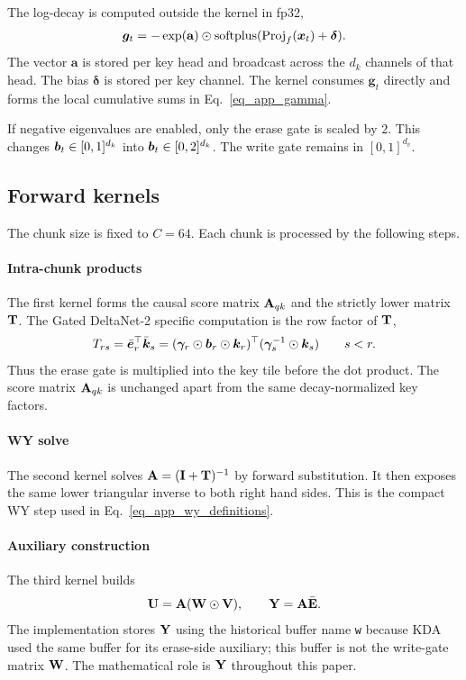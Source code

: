 The log-decay is computed outside the kernel in fp32,
\begin{align}
    \boldsymbol{g}_t
    =
    -\exp(\mathbf{a})\odot
    \operatorname{softplus}(\operatorname{Proj}_{f}({\bm{x}}_t)+\boldsymbol{\delta}).
\label{eq_app_layer_decay}
\end{align}
The vector $\mathbf{a}$ is stored per key head and broadcast across the $d_k$ channels of that head. The bias $\boldsymbol{\delta}$ is stored per key channel. The kernel consumes $\boldsymbol{g}_t$ directly and forms the local cumulative sums in Eq.~\ref{eq_app_gamma}.

If negative eigenvalues are enabled, only the erase gate is scaled by $2$. This changes ${\bm{b}}_t\in[0,1]^{d_k}$ into ${\bm{b}}_t\in[0,2]^{d_k}$. The write gate remains in $[0,1]^{d_v}$.

\subsection{Forward kernels}
\label{app_forward_kernels}

The chunk size is fixed to $C=64$. Each chunk is processed by the following steps.

\paragraph{Intra-chunk products}
The first kernel forms the causal score matrix ${\mathbf{A}}_{qk}$ and the strictly lower matrix ${\mathbf{T}}$. The Gated DeltaNet-2 specific computation is the row factor of ${\mathbf{T}}$,
\begin{align}
    T_{rs}
    =
    \bar{{\bm{e}}}_r^\top\bar{{\bm{k}}}_s
    =
    (\boldsymbol{\gamma}_r\odot{\bm{b}}_r\odot{\bm{k}}_r)^\top
    (\boldsymbol{\gamma}_s^{-1}\odot{\bm{k}}_s)
    \qquad
    s<r .
\label{eq_app_kernel_T}
\end{align}
Thus the erase gate is multiplied into the key tile before the dot product. The score matrix ${\mathbf{A}}_{qk}$ is unchanged apart from the same decay-normalized key factors.

\paragraph{WY solve}
The second kernel solves ${\mathbf{A}}=({\mathbf{I}}+{\mathbf{T}})^{-1}$ by forward substitution. It then exposes the same lower triangular inverse to both right hand sides. This is the compact WY step used in Eq.~\ref{eq_app_wy_definitions}.

\paragraph{Auxiliary construction}
The third kernel builds
\begin{align}
    {\mathbf{U}} = {\mathbf{A}}({\mathbf{W}}\odot{\mathbf{V}}),
    \qquad
    {\mathbf{Y}} = {\mathbf{A}}\bar{{\mathbf{E}}}.
\label{eq_app_kernel_aux}
\end{align}
The implementation stores ${\mathbf{Y}}$ using the historical buffer name \texttt{w} because KDA used the same buffer for its erase-side auxiliary; this buffer is not the write-gate matrix ${\mathbf{W}}$. The mathematical role is ${\mathbf{Y}}$ throughout this paper.


